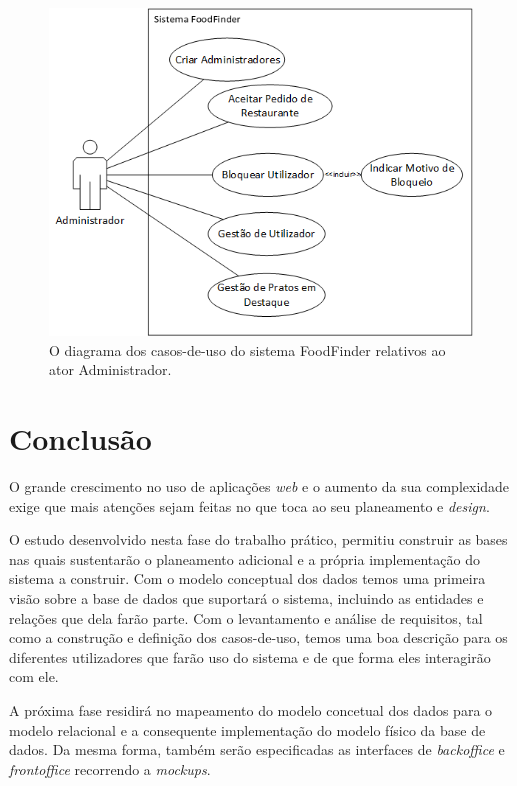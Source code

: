 \documentclass[a4paper,12pt]{report}
\begin{document}
	\begin{figure}[H]
	\begin{center}
	\includegraphics[scale=0.70]{casoUso_administrador}	
	\end{center}
	\medskip
	\caption{O diagrama dos casos-de-uso do sistema FoodFinder relativos ao ator Administrador.}
	\label{fig:casoUso_administrador}	
	\end{figure}
	

\chapter{Conclusão}	

	O grande crescimento no uso de aplicações \textit{web} e o aumento da sua complexidade exige que mais atenções sejam feitas no que toca ao seu planeamento e \textit{design}.
	
	O estudo desenvolvido nesta fase do trabalho prático, permitiu construir as bases nas quais sustentarão o planeamento adicional e a própria implementação do sistema a construir. Com o modelo conceptual dos dados temos uma primeira visão sobre a base de dados que suportará o sistema, incluindo as entidades e relações que dela farão parte. Com o levantamento e análise de requisitos, tal como a construção e definição dos casos-de-uso, temos uma boa descrição para os diferentes utilizadores que farão uso do sistema e de que forma eles interagirão com ele. 
	
	A próxima fase residirá no mapeamento do modelo concetual dos dados para o modelo relacional e a consequente implementação do modelo físico da base de dados. Da mesma forma, também serão especificadas as interfaces de \textit{backoffice} e \textit{frontoffice} recorrendo a \textit{mockups}.
\end{document}
